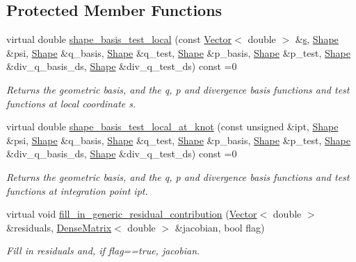 \subsection*{Protected Member Functions}
\begin{DoxyCompactItemize}
\item 
virtual double \hyperlink{classoomph_1_1DarcyEquations_a4052cf1c7cd03d9ea206f4cf885ef5ae}{shape\+\_\+basis\+\_\+test\+\_\+local} (const \hyperlink{classoomph_1_1Vector}{Vector}$<$ double $>$ \&\hyperlink{cfortran_8h_ab7123126e4885ef647dd9c6e3807a21c}{s}, \hyperlink{classoomph_1_1Shape}{Shape} \&psi, \hyperlink{classoomph_1_1Shape}{Shape} \&q\+\_\+basis, \hyperlink{classoomph_1_1Shape}{Shape} \&q\+\_\+test, \hyperlink{classoomph_1_1Shape}{Shape} \&p\+\_\+basis, \hyperlink{classoomph_1_1Shape}{Shape} \&p\+\_\+test, \hyperlink{classoomph_1_1Shape}{Shape} \&div\+\_\+q\+\_\+basis\+\_\+ds, \hyperlink{classoomph_1_1Shape}{Shape} \&div\+\_\+q\+\_\+test\+\_\+ds) const =0
\begin{DoxyCompactList}\small\item\em Returns the geometric basis, and the q, p and divergence basis functions and test functions at local coordinate s. \end{DoxyCompactList}\item 
virtual double \hyperlink{classoomph_1_1DarcyEquations_a43dc36e25fe5eed15066f50e4122c42b}{shape\+\_\+basis\+\_\+test\+\_\+local\+\_\+at\+\_\+knot} (const unsigned \&ipt, \hyperlink{classoomph_1_1Shape}{Shape} \&psi, \hyperlink{classoomph_1_1Shape}{Shape} \&q\+\_\+basis, \hyperlink{classoomph_1_1Shape}{Shape} \&q\+\_\+test, \hyperlink{classoomph_1_1Shape}{Shape} \&p\+\_\+basis, \hyperlink{classoomph_1_1Shape}{Shape} \&p\+\_\+test, \hyperlink{classoomph_1_1Shape}{Shape} \&div\+\_\+q\+\_\+basis\+\_\+ds, \hyperlink{classoomph_1_1Shape}{Shape} \&div\+\_\+q\+\_\+test\+\_\+ds) const =0
\begin{DoxyCompactList}\small\item\em Returns the geometric basis, and the q, p and divergence basis functions and test functions at integration point ipt. \end{DoxyCompactList}\item 
virtual void \hyperlink{classoomph_1_1DarcyEquations_a3ca52cedfaf3579f2854c3f9b57de622}{fill\+\_\+in\+\_\+generic\+\_\+residual\+\_\+contribution} (\hyperlink{classoomph_1_1Vector}{Vector}$<$ double $>$ \&residuals, \hyperlink{classoomph_1_1DenseMatrix}{Dense\+Matrix}$<$ double $>$ \&jacobian, bool flag)
\begin{DoxyCompactList}\small\item\em Fill in residuals and, if flag==true, jacobian. \end{DoxyCompactList}\end{DoxyCompactItemize}
